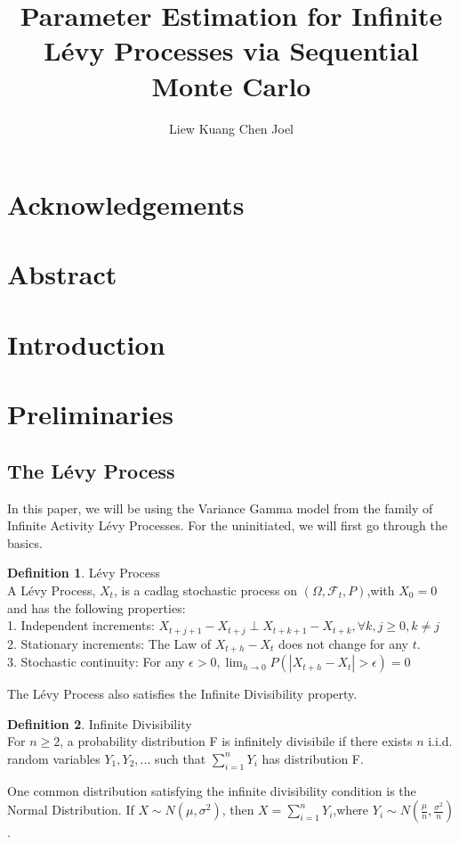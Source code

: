 \documentclass[12pt]{article}
\title{Parameter Estimation for Infinite L\'{e}vy Processes via Sequential Monte Carlo}
\author{Liew Kuang Chen Joel}
\theoremstyle{definition}
\newtheorem{definition}{Definition}[section]
\begin{document}
\maketitle
\newpage 
\section*{Acknowledgements}
\newpage
\section*{Abstract}
\newpage

\tableofcontents
\newpage

\section{Introduction}

\section{Preliminaries}

\subsection{The L\'{e}vy Process}
In this paper, we will be using the Variance Gamma model from the family of Infinite Activity L\'{e}vy Processes. For the uninitiated, we will first go through the basics.
\theoremstyle{definition}
\begin{definition}{L\'{e}vy Process}\\
A L\'{e}vy Process, $X_{t}$, is a cadlag stochastic process on $(\Omega,\mathcal{F}_{t},P)$,with $X_{0}=0$ and has the following properties:\\
1. Independent increments: $X_{t+j+1} - X_{t+j} \perp X_{t+k+1} - X_{t+k}, \forall k,j \ge 0 , k \neq j$\\
2. Stationary increments: The Law of $X_{t+h} - X_{t}$ does not change for any $t$.\\
3. Stochastic continuity: For any $\epsilon>0, \lim_{h\rightarrow 0} P(|X_{t+h}-X_{t}|>\epsilon) = 0$
\end{definition}
\justify The L\'{e}vy Process also satisfies the Infinite Divisibility property.
\begin{definition}{Infinite Divisibility} \\
For $n\ge 2$, a probability distribution F is infinitely divisibile if there exists $n$ i.i.d. random variables $Y_{1},Y_{2},...$ such that $\sum_{i=1}^{n} Y_{i}$ has distribution F.
\end{definition}
\justify One common distribution satisfying the infinite divisibility condition is the Normal Distribution. If $X \sim N(\mu,\sigma^{2})$, then $X = \sum_{i=1}^{n} Y_{i}$,where $Y_{i} \sim N(\frac{\mu}{n},\frac{\sigma^{2}}{n})$.
\end{document}
